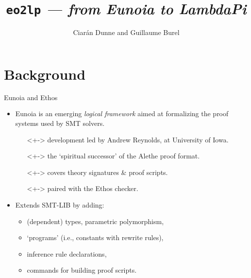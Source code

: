 \documentclass[lualatex, compress, 12pt, handout]{beamer}
\title{\texttt{eo2lp} \textit{--- from Eunoia to LambdaPi}}
\author{Ciarán Dunne and Guillaume Burel}
\institute{ENS Paris-Saclay, INRIA}
\begin{document}
\frame[plain]{\titlepage}

\section{Background}


%
%


%

\begin{frame}[fragile]{Eunoia and Ethos}
	\begin{itemize}
		\item<+->
		      \alert{Eunoia} is an emerging \emph{logical framework} aimed at
		      formalizing the proof systems used by SMT solvers.
		      \begin{itemize}
			      \item[\emoji{flag-united-states}]<+-> development led by Andrew Reynolds, at University of Iowa.
			      \item[\emoji{ghost}]<+-> the `spiritual successor' of the \alert{Alethe} proof format.
			      \item[\emoji{scroll}]<+-> covers theory signatures \& proof scripts.
			      \item[\emoji{check-mark}]<+-> paired with the \alert{Ethos} checker.
		      \end{itemize}

		\item<+-> Extends SMT-LIB by adding:
		      \begin{itemize}
			      \item<+->(dependent) types, parametric polymorphism,
			      \item<+->`programs' (i.e., constants with rewrite rules),
			      \item<+->inference rule declarations,
			      \item<+->commands for building proof scripts.
		      \end{itemize}
	\end{itemize}
\end{frame}
\end{document}
